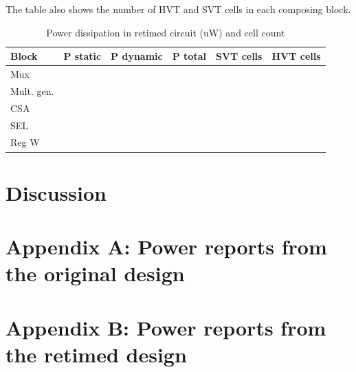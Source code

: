 \documentclass[11pt,a4paper]{article}
\begin{document}
The table also shows the number of HVT and SVT cells in each composing block.
\begin{table}[htbp]
\caption{Power dissipation in retimed circuit (uW) and cell count}
\begin{center}
\begin{tabular}{|l|l|l|l|l|l|} %
\hline
\textbf{Block}	& \textbf{P static}		& \textbf{P dynamic}	& \textbf{P total} & \textbf{SVT cells} & \textbf{HVT cells}\\ \hline
Mux &  &  &  &  &  	\\ \hline
Mult. gen. &  &  &  &  &  	\\ \hline
CSA &  &  &  &  &  	\\ \hline
SEL &  &  &  &  &  	\\ \hline
Reg W &  &  &  &  &  	\\ \hline
\end{tabular}
\end{center}
\label{table:powerRetimed}
\end{table}

\section{Discussion}

\section{Appendix A: Power reports from the original design}

\section{Appendix B: Power reports from the retimed design}



\end{document}
